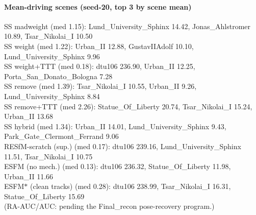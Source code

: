 \documentclass[10pt]{article}
\begin{document}
\paragraph{Mean-driving scenes (seed-20, top 3 by scene mean)}
\indent SS madweight (med 1.15): Lund\_University\_Sphinx 14.42, Jonas\_Ahlstromer 10.89, Tsar\_Nikolai\_I 10.50\\
\indent SS weight (med 1.22): Urban\_II 12.88, GustavIIAdolf 10.10, Lund\_University\_Sphinx 9.96\\
\indent SS weight+TTT (med 0.18): dtu106 236.90, Urban\_II 12.25, Porta\_San\_Donato\_Bologna 7.28\\
\indent SS remove (med 1.39): Tsar\_Nikolai\_I 10.55, Urban\_II 9.26, Lund\_University\_Sphinx 8.84\\
\indent SS remove+TTT (med 2.26): Statue\_Of\_Liberty 20.74, Tsar\_Nikolai\_I 15.24, Urban\_II 13.68\\
\indent SS hybrid (med 1.34): Urban\_II 14.01, Lund\_University\_Sphinx 9.43, Park\_Gate\_Clermont\_Ferrand 9.06\\
\indent RESfM-scratch (sup.) (med 0.17): dtu106 239.16, Lund\_University\_Sphinx 11.51, Tsar\_Nikolai\_I 10.75\\
\indent ESFM (no mech.) (med 0.13): dtu106 236.32, Statue\_Of\_Liberty 11.98, Urban\_II 11.66\\
\indent ESFM$\ast$ (clean tracks) (med 0.28): dtu106 238.99, Tsar\_Nikolai\_I 16.31, Statue\_Of\_Liberty 15.69\\
(RA-AUC/AUC: pending the Final\_recon pose-recovery program.)
\end{document}

